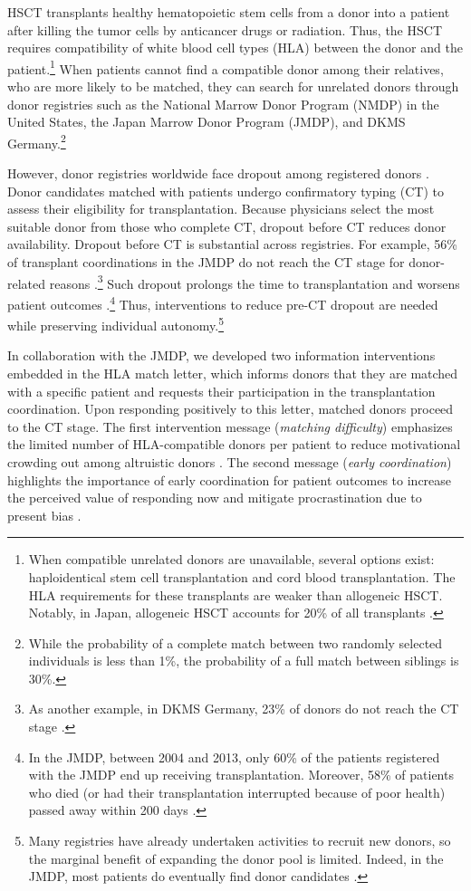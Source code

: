 \documentclass[12pt, a4paper]{article}
\begin{document}
HSCT transplants healthy hematopoietic stem cells from a donor into a patient after killing the tumor cells by anticancer drugs or radiation. Thus, the HSCT requires compatibility of white blood cell types (HLA) between the donor and the patient.\footnote{When compatible unrelated donors are unavailable, several options exist: haploidentical stem cell transplantation and cord blood transplantation. The HLA requirements for these transplants are weaker than allogeneic HSCT. Notably, in Japan, allogeneic HSCT accounts for 20\% of all transplants \citep{JDCHCT2022}.} When patients cannot find a compatible donor among their relatives, who are more likely to be matched, they can search for unrelated donors through donor registries such as the National Marrow Donor Program (NMDP) in the United States, the Japan Marrow Donor Program (JMDP), and DKMS Germany.\footnote{While the probability of a complete match between two randomly selected individuals is less than 1\%, the probability of a full match between siblings is 30\%.}

However, donor registries worldwide face dropout among registered donors \citep{Switzer2004, Lown2014, Hamed2023}. Donor candidates matched with patients undergo confirmatory typing (CT) to assess their eligibility for transplantation. Because physicians select the most suitable donor from those who complete CT, dropout before CT reduces donor availability. Dropout before CT is substantial across registries. For example, 56\% of transplant coordinations in the JMDP do not reach the CT stage for donor-related reasons \citep{Hirakawa2018}.\footnote{As another example, in DKMS Germany, 23\% of donors do not reach the CT stage \citep{Haylock2024}.} Such dropout prolongs the time to transplantation and worsens patient outcomes \citep{Lown2013}.\footnote{In the JMDP, between 2004 and 2013, only 60\% of the patients registered with the JMDP end up receiving transplantation. Moreover, 58\% of patients who died (or had their transplantation interrupted because of poor health) passed away within 200 days \citep{Hirakawa2018}.} Thus, interventions to reduce pre-CT dropout are needed while preserving individual autonomy.\footnote{Many registries have already undertaken activities to recruit new donors, so the marginal benefit of expanding the donor pool is limited. Indeed, in the JMDP, most patients do eventually find donor candidates \citep{Takanashi2016}.}

In collaboration with the JMDP, we developed two information interventions embedded in the HLA match letter, which informs donors that they are matched with a specific patient and requests their participation in the transplantation coordination. Upon responding positively to this letter, matched donors proceed to the CT stage. The first intervention message (\emph{matching difficulty}) emphasizes the limited number of HLA-compatible donors per patient to reduce motivational crowding out among altruistic donors \citep{Bergstrom2009, Kurosawa2022}. The second message (\emph{early coordination}) highlights the importance of early coordination for patient outcomes to increase the perceived value of responding now and mitigate procrastination due to present bias \citep{Laibson1997, ODonoghue2001}.
\end{document}
